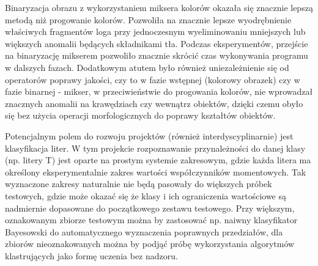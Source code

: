 \documentclass[11pt,a4paper]{article} %
\numberwithin{equation}{section} %
\numberwithin{figure}{section} %
\numberwithin{table}{section} %
\begin{document}
Binaryzacja obrazu z wykorzystaniem miksera kolorów okazała się znacznie lepszą metodą niż progowanie kolorów. Pozwoliła na znacznie lepsze wyodrębnienie właściwych fragmentów loga przy jednoczesnym wyeliminowaniu mniejszych lub większych anomalii będących składnikami tła. Podczas eksperymentów, przejście na binaryzację mikserem pozwoliło znacznie skrócić czas wykonywania programu w dalszych fazach. Dodatkowym atutem było również uniezależnienie się od operatorów poprawy jakości, czy to w fazie wstępnej (kolorowy obrazek) czy w fazie binarnej - mikser, w przeciwieństwie do progowania kolorów, nie wprowadzał znacznych anomalii na krawędziach czy wewnątrz obiektów, dzięki czemu obyło się bez użycia operacji morfologicznych do poprawy kształtów obiektów.

Potencjalnym polem do rozwoju projektów (również interdyscyplinarnie) jest klasyfikacja liter. W tym projekcie rozpoznawanie przynależności do danej klasy (np. litery T) jest oparte na prostym systemie zakresowym, gdzie każda litera ma określony eksperymentalnie zakres wartości współczynników momentowych. Tak wyznaczone zakresy naturalnie nie będą pasowały do większych próbek testowych, gdzie może okazać się że klasy i ich ograniczenia wartościowe są nadmiernie dopasowane do początkowego zestawu testowego. Przy większym, oznakowanym zbiorze testowym można by zastosować np. naiwny klasyfikator Bayesowski do automatycznego wyznaczenia poprawnych przedziałów, dla zbiorów nieoznakowanych można by podjąć próbę wykorzystania algorytmów klastrujących jako formę uczenia bez nadzoru.
\end{document}
